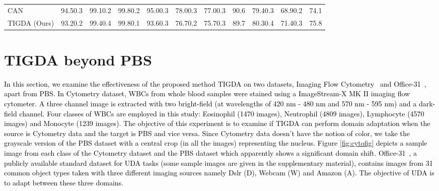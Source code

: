 \documentclass[journal,twoside,web]{IEEEtran}
\newcommand{\bb}{\textcolor{black}}
\begin{document}
\begin{table*}[t]
\begin{center}
{\begin{tabular}{l|ccccccc|ccc}
    {CAN~\cite{kang2019contrastive}}&94.50.3&99.10.2&99.80.2&95.00.3&78.00.3&77.00.3&90.6&79.40.3&68.90.2&74.1\\
    











  {TIGDA (Ours)}&93.20.2&99.40.4&99.80.1&93.60.3&76.70.2&75.70.3&89.7&80.30.4&71.40.3&75.8\\
    
    \bottomrule
\end{tabular}
}
\end{center}
\label{tab:compoffice}
\end{table*}



\section{TIGDA beyond PBS}
\bb{
In this section, we examine the effectiveness of the proposed method TIGDA on two datasets, Imaging Flow Cytometry~\cite{lippeveld2019classification} and Office-31~\cite{saenko2010adapting}, apart from PBS. In Cytometry dataset, WBCs from whole blood samples were stained using a ImageStream-X MK II imaging flow cytometer. A three channel image is extracted with two bright-field (at wavelengths of 420 nm - 480 nm and 570 nm - 595 nm) and a dark-field channel. Four classes of WBCs are employed in this study: Eosinophil (1470 images), Neutrophil (4809 images), Lymphocyte (4570 images) and Monocyte (1239 images). The objective of this experiment is to examine if TIGDA can perform domain adaptation when the source is Cytometry data and the target is PBS and vice versa. Since Cytometry data doesn't have the notion of color, we take the grayscale version of the PBS dataset with a  central crop (in all the images) representing the nucleus. Figure \ref{fig:cytofig} depicts a sample image from each class of the Cytometry dataset and the PBS dataset which apparently shows a significant domain shift.} \bb{Office-31~\cite{saenko2010adapting}, a publicly available standard dataset for UDA tasks (some sample images are given in the supplementary material), contains images from 31 common object types taken with three different imaging sources namely Dslr (D), Webcam (W) and Amazon (A). The objective of UDA is to adapt between these three domains.}
\end{document}
